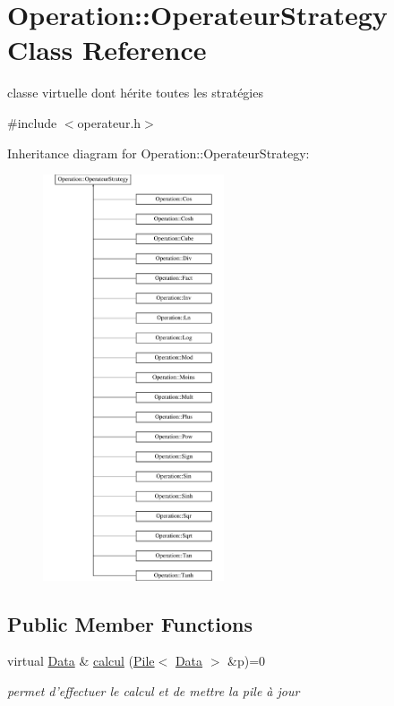 \hypertarget{classOperation_1_1OperateurStrategy}{
\section{Operation::OperateurStrategy Class Reference}
\label{classOperation_1_1OperateurStrategy}
}


classe virtuelle dont hérite toutes les stratégies  




{\ttfamily \#include $<$operateur.h$>$}

Inheritance diagram for Operation::OperateurStrategy:\begin{figure}[H]
\begin{center}
\leavevmode
\includegraphics[height=12cm]{classOperation_1_1OperateurStrategy}
\end{center}
\end{figure}
\subsection*{Public Member Functions}
\begin{DoxyCompactItemize}
\item 
virtual \hyperlink{classNombre_1_1Data}{Data} \& \hyperlink{classOperation_1_1OperateurStrategy_a3a62ee4f37c773e8459f92c41b3127e1}{calcul} (\hyperlink{classPile}{Pile}$<$ \hyperlink{classNombre_1_1Data}{Data} $>$ \&p)=0
\begin{DoxyCompactList}\small\item\em permet d'effectuer le calcul et de mettre la pile à jour \item\end{DoxyCompactList}\end{DoxyCompactItemize}


